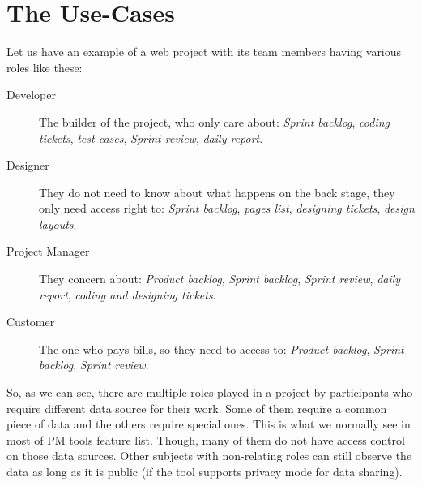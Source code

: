 
\section{The Use-Cases}
\label{ch:introduction:use_cases}
Let us have an example of a web project with its team members having various roles like these:
\begin{description}
\item[Developer] The builder of the project, who only care about: \emph{Sprint backlog}, \emph{coding tickets}, \emph{test cases}, \emph{Sprint review}, \emph{daily report}.
\item[Designer] They do not need to know about what happens on the back stage, they only need access right to: \emph{Sprint backlog}, \emph{pages list}, \emph{designing tickets}, \emph{design layouts}.
\item[Project Manager] They concern about: \emph{Product backlog}, \emph{Sprint backlog}, \emph{Sprint review}, \emph{daily report}, \emph{coding and designing tickets}.
\item[Customer] The one who pays bills, so they need to access to: \emph{Product backlog}, \emph{Sprint backlog}, \emph{Sprint review}.
\end{description}

So, as we can see, there are multiple roles played in a project by participants who require different data source for their work.
Some of them require a common piece of data and the others require special ones.
This is what we normally see in most of PM tools feature list.
Though, many of them do not have access control on those data sources.
Other subjects with non-relating roles can still observe the data as long as it is public (if the tool supports privacy mode for data sharing).

